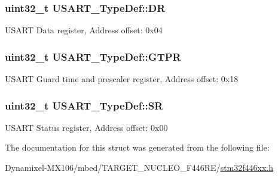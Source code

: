 \subsubsection[{\texorpdfstring{DR}{DR}}]{ uint32\+\_\+t U\+S\+A\+R\+T\+\_\+\+Type\+Def\+::\+DR}\hypertarget{struct_u_s_a_r_t___type_def_a1db25b74d47af33dc4f4fe2177fc5da0}{}\label{struct_u_s_a_r_t___type_def_a1db25b74d47af33dc4f4fe2177fc5da0}
U\+S\+A\+RT Data register, Address offset\+: 0x04 
\subsubsection[{\texorpdfstring{G\+T\+PR}{GTPR}}]{ uint32\+\_\+t U\+S\+A\+R\+T\+\_\+\+Type\+Def\+::\+G\+T\+PR}\hypertarget{struct_u_s_a_r_t___type_def_ae23acff49b4ff96fd29093e80fc7d72e}{}\label{struct_u_s_a_r_t___type_def_ae23acff49b4ff96fd29093e80fc7d72e}
U\+S\+A\+RT Guard time and prescaler register, Address offset\+: 0x18 
\subsubsection[{\texorpdfstring{SR}{SR}}]{ uint32\+\_\+t U\+S\+A\+R\+T\+\_\+\+Type\+Def\+::\+SR}\hypertarget{struct_u_s_a_r_t___type_def_a706005f59139b9ff8ee5755677e12bc7}{}\label{struct_u_s_a_r_t___type_def_a706005f59139b9ff8ee5755677e12bc7}
U\+S\+A\+RT Status register, Address offset\+: 0x00 

The documentation for this struct was generated from the following file\+:\begin{DoxyCompactItemize}
\item 
Dynamixel-\/\+M\+X106/mbed/\+T\+A\+R\+G\+E\+T\+\_\+\+N\+U\+C\+L\+E\+O\+\_\+\+F446\+R\+E/\hyperlink{stm32f446xx_8h}{stm32f446xx.\+h}\end{DoxyCompactItemize}
